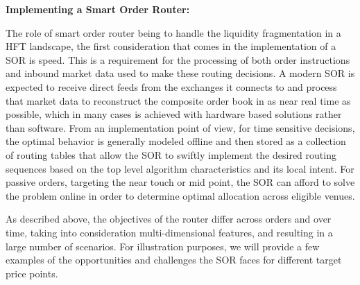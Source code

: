 \noindent\textbf{Implementing a Smart Order Router:} \twomedskip


The role of smart order router being to handle the liquidity fragmentation in a HFT landscape, the first consideration that comes in the implementation of a SOR is speed. This is a requirement for the processing of both order instructions and inbound market data used to make these routing decisions. A modern SOR is expected to receive direct feeds from the exchanges it connects to and process that market data to reconstruct the composite order book in as near real time as possible, which in many cases is achieved with hardware based solutions rather than software. From an implementation point of view, for time sensitive decisions, the optimal behavior is generally modeled offline and then stored as a collection of routing tables that allow the SOR to swiftly implement the desired routing sequences based on the top level algorithm characteristics and its local intent. For passive orders, targeting the near touch or mid point, the SOR can afford to solve the problem online in order to determine optimal allocation across eligible venues. 


As described above, the objectives of the router differ across orders and over time, taking into consideration multi-dimensional features, and resulting in a large number of scenarios. For illustration purposes, we will provide a few examples of the opportunities and challenges the SOR faces for different target price points. 


